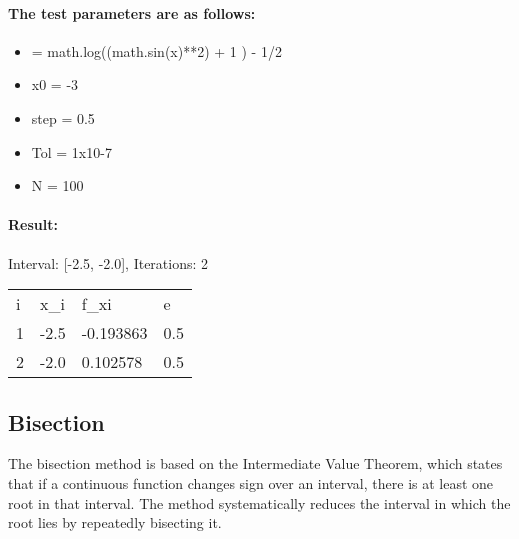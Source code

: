 \documentclass{article}
\begin{document}
    \paragraph{The test parameters are as follows:}
        \begin{itemize}
            \item {\textflorin = math.log((math.sin(x)**2) + 1 ) - 1/2}
            \item {x0 = -3}
            \item {step = 0.5}
            \item {Tol = 1x10-7}
            \item {N = 100}
        \end{itemize}

    \paragraph{Result:}
        Interval: [-2.5, -2.0], Iterations: 2

        \begin{table}[ht]
        \begin{tabular}{llll}
        i & x\_i & f\_xi     & e   \\
        1 & -2.5 & -0.193863 & 0.5 \\
        2 & -2.0 & 0.102578  & 0.5
        \end{tabular}\label{tab:table}
        \end{table}

    \subsection{Bisection}\label{subsec:bisection}

    The bisection method is based on the Intermediate Value Theorem, which states that if a continuous function changes
    sign over an interval, there is at least one root in that interval. The method systematically reduces the interval
    in which the root lies by repeatedly bisecting it.
\end{document}
